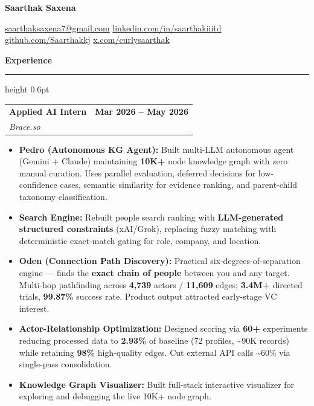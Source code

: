 \documentclass[10pt,letterpaper]{article}
\makeatletter
\newcommand{\name}[1]{%
  {\Large\bfseries #1}\par\vspace{1pt}
}
\newcommand{\contact}[1]{%
  {\footnotesize #1}\par\vspace{2pt}
}
\newcommand{\sectiontitle}[1]{%
  \vspace{1pt}
  {\normalsize\bfseries\color{accent} #1}\par
  \vspace{0.5pt}
  {\color{accent}\hrule height 0.6pt}
  \vspace{1pt}
}
\newcommand{\entry}[4]{%
  \begin{tabularx}{\textwidth}{@{}X r@{}}
    {\bfseries #1} & {\footnotesize\bfseries #2} \\
    {\footnotesize\textit{#3}} & {\footnotesize #4}
  \end{tabularx}
  \vspace{0pt}
}
\newenvironment{tightitems}{%
  \begin{itemize}
    \setlength{\itemsep}{0pt}
    \setlength{\parskip}{0pt}
    \setlength{\parsep}{0pt}
    \setlength{\topsep}{0pt}
    \setlength{\leftmargin}{10pt}
    \setlength{\itemindent}{0pt}
}{%
  \end{itemize}
  \vspace{-2.5pt}
}
\makeatother
\begin{document}
\fontsize{9.5}{10.6}\selectfont
\raggedright

\name{Saarthak Saxena}
\contact{\href{mailto:saarthaksaxena7@gmail.com}{saarthaksaxena7@gmail.com} \textbar{}
\href{https://www.linkedin.com/in/saarthakiiitd/}{linkedin.com/in/saarthakiiitd} \textbar{}
\href{https://github.com/Saarthakkj}{github.com/Saarthakkj} \textbar{}
\href{https://x.com/curlysaarthak}{x.com/curlysaarthak}}

\sectiontitle{Experience}

\entry{Applied AI Intern}{\textbf{Mar 2026 -- May 2026}}{Brace.so}{}
\vspace{-3pt}
\begin{tightitems}
  \item \textbf{Pedro (Autonomous KG Agent):} Built multi-LLM autonomous agent (Gemini + Claude) maintaining \textbf{10K+} node knowledge graph with zero manual curation. Uses parallel evaluation, deferred decisions for low-confidence cases, semantic similarity for evidence ranking, and parent-child taxonomy classification.
  \item \textbf{Search Engine:} Rebuilt people search ranking with \textbf{LLM-generated structured constraints} (xAI/Grok), replacing fuzzy matching with deterministic exact-match gating for role, company, and location.
  \item \textbf{Oden (Connection Path Discovery):} Practical six-degrees-of-separation engine — finds the \textbf{exact chain of people} between you and any target. Multi-hop pathfinding across \textbf{4,739} actors / \textbf{11,609} edges; \textbf{3.4M+} directed trials, \textbf{99.87\%} success rate. Product output attracted early-stage VC interest.
  \item \textbf{Actor-Relationship Optimization:} Designed scoring via \textbf{60+} experiments reducing processed data to \textbf{2.93\%} of baseline (72 profiles, \textasciitilde{}90K records) while retaining \textbf{98\%} high-quality edges. Cut external API calls \textasciitilde{}60\% via single-pass consolidation.
  \item \textbf{Knowledge Graph Visualizer:} Built full-stack interactive visualizer for exploring and debugging the live 10K+ node graph.
\end{tightitems}
\vspace{-3.5pt}
\end{document}
